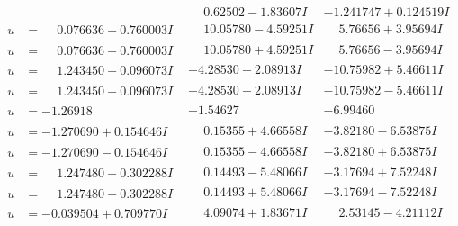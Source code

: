 \documentclass[1p]{elsarticle_modified}
\theoremstyle{definition}
\begin{document}
$$\begin{array}{c|c|c}
 & \phantom{-}0.62502 - 1.83607 I & -1.241747 + 0.124519 I \\ \hline\begin{aligned}
u &= \phantom{-}0.076636 + 0.760003 I\end{aligned}
 & \phantom{-}10.05780 - 4.59251 I & \phantom{-}5.76656 + 3.95694 I \\ \hline\begin{aligned}
u &= \phantom{-}0.076636 - 0.760003 I\end{aligned}
 & \phantom{-}10.05780 + 4.59251 I & \phantom{-}5.76656 - 3.95694 I \\ \hline\begin{aligned}
u &= \phantom{-}1.243450 + 0.096073 I\end{aligned}
 & -4.28530 - 2.08913 I & -10.75982 + 5.46611 I \\ \hline\begin{aligned}
u &= \phantom{-}1.243450 - 0.096073 I\end{aligned}
 & -4.28530 + 2.08913 I & -10.75982 - 5.46611 I \\ \hline\begin{aligned}
u &= -1.26918\phantom{ +0.000000I}\end{aligned}
 & -1.54627\phantom{ +0.000000I} & -6.99460\phantom{ +0.000000I} \\ \hline\begin{aligned}
u &= -1.270690 + 0.154646 I\end{aligned}
 & \phantom{-}0.15355 + 4.66558 I & -3.82180 - 6.53875 I \\ \hline\begin{aligned}
u &= -1.270690 - 0.154646 I\end{aligned}
 & \phantom{-}0.15355 - 4.66558 I & -3.82180 + 6.53875 I \\ \hline\begin{aligned}
u &= \phantom{-}1.247480 + 0.302288 I\end{aligned}
 & \phantom{-}0.14493 - 5.48066 I & -3.17694 + 7.52248 I \\ \hline\begin{aligned}
u &= \phantom{-}1.247480 - 0.302288 I\end{aligned}
 & \phantom{-}0.14493 + 5.48066 I & -3.17694 - 7.52248 I \\ \hline\begin{aligned}
u &= -0.039504 + 0.709770 I\end{aligned}
 & \phantom{-}4.09074 + 1.83671 I & \phantom{-}2.53145 - 4.21112 I \\ \hline\begin{aligned}

\end{aligned}
\end{array}$$
\end{document}
